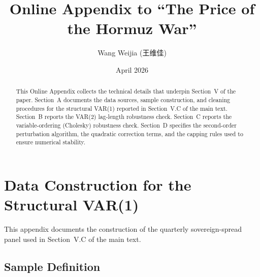 \documentclass[12pt]{article}
\title{\textbf{Online Appendix to ``The Price of the Hormuz War''}}
\author{Wang Weijia (王维佳)}
\date{April 2026}
\begin{document}
\maketitle

\begin{abstract}
\noindent
This Online Appendix collects the technical details that underpin Section~V of the paper. Section~A documents the data sources, sample construction, and cleaning procedures for the structural VAR(1) reported in Section~V.C of the main text. Section~B reports the VAR(2) lag-length robustness check. Section~C reports the variable-ordering (Cholesky) robustness check. Section~D specifies the second-order perturbation algorithm, the quadratic correction terms, and the capping rules used to ensure numerical stability.
\end{abstract}

\tableofcontents
\newpage



\section{Data Construction for the Structural VAR(1)}
\label{app:data}

This appendix documents the construction of the quarterly sovereign-spread panel used in Section~V.C of the main text.

\subsection{Sample Definition}
\end{document}
